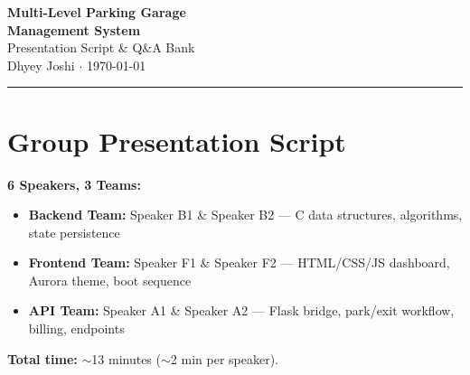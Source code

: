 \documentclass[12pt, a4paper]{article}
\begin{document}
\begin{center}
  {\LARGE\bfseries Multi-Level Parking Garage\\Management System}\\[0.5cm]
  {\large Presentation Script \& Q\&A Bank}\\[0.3cm]
  {\normalsize Dhyey Joshi \quad $\cdot$ \quad \today}
\end{center}

\vspace{0.5cm}
\hrule
\vspace{0.5cm}

\tableofcontents
\newpage

\part{Group Presentation Script}

\textbf{6 Speakers, 3 Teams:}
\begin{itemize}[nosep]
  \item \textbf{Backend Team:} Speaker B1 \& Speaker B2 --- C data structures, algorithms, state persistence
  \item \textbf{Frontend Team:} Speaker F1 \& Speaker F2 --- HTML/CSS/JS dashboard, Aurora theme, boot sequence
  \item \textbf{API Team:} Speaker A1 \& Speaker A2 --- Flask bridge, park/exit workflow, billing, endpoints
\end{itemize}

\textbf{Total time:} $\sim$13 minutes ($\sim$2 min per speaker).
\end{document}
